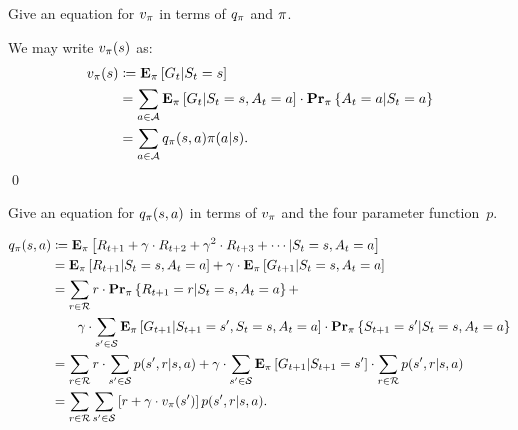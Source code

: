 \begin{exer}
Give an equation for $v_{\pi}$ in terms of $q_{\pi}$ and $\pi$.
\end{exer}
\begin{solution}
We may write $v_{\pi}(s)$ as:
\begin{align*}
    v_{\pi}(s) & \coloneqq \mathbf{E}_{\pi} \left [ G_t \vert S_t = s \right ] \\
                   & = \sum_{a \in \mathcal{A}} \mathbf{E}_{\pi} \left [ G_t \vert S_t = s, A_t = a \right ] 
                        \cdot \mathbf{Pr}_{\pi} \left \{ A_t = a \vert S_t = a \right \} \\
                   & = \sum_{a \in \mathcal{A}} q_{\pi}(s, a) \pi (a \vert s).
\end{align*}
\qed
\end{solution}

\begin{exer}
\label{exer:q_in_terms_of_v}
Give an equation for $q_{\pi} (s, a)$ in terms of $v_{\pi}$ and the 
four parameter function~$p$. 
\end{exer}
\begin{solution}
\begin{align*}
    q_{\pi}(s, a) & \coloneqq \mathbf{E}_{\pi} \left [ R_{t + 1} + \gamma \cdot R_{t + 2} + \gamma^2 \cdot R_{t + 3} + \cdots \vert S_t = s, A_t = a \right ] \\
                  & = \mathbf{E}_{\pi} \left [ R_{t + 1} \vert S_t = s, A_t = a \right ] + 
                    \gamma \cdot \mathbf{E}_{\pi} \left [ G_{t + 1} \vert S_t = s, A_t = a \right ] \\
                  & = \sum_{r \in \mathcal{R}} r \cdot \mathbf{Pr}_{\pi} \left \{ R_{t + 1} = r \vert S_t = s, A_t = a \right \} + \\
                  & \quad \quad \gamma \cdot \sum_{s' \in \mathcal{S}} \mathbf{E}_{\pi} \left [ G_{t + 1} \vert S_{t + 1} = s', S_t = s, A_t = a \right ]
                        \cdot \mathbf{Pr}_{\pi} \left \{ S_{t + 1} = s' \vert S_t = s, A_t = a \right \} \\ 
                  & = \sum_{r \in \mathcal{R}} r \cdot \sum_{s' \in \mathcal{S}} p(s', r \vert s, a) + 
                    \gamma \cdot \sum_{s' \in \mathcal{S}} \mathbf{E}_{\pi} \left [ G_{t + 1} \vert S_{t + 1} = s' \right ] 
                        \cdot \sum_{r \in \mathcal{R}} p(s', r \vert s, a) \\
                  & = \sum_{r \in \mathcal{R}} \sum_{s' \in \mathcal{S}} \left [ r + \gamma \cdot v_{\pi}(s') \right ] p(s', r \vert s, a).
\end{align*}
\end{solution}

